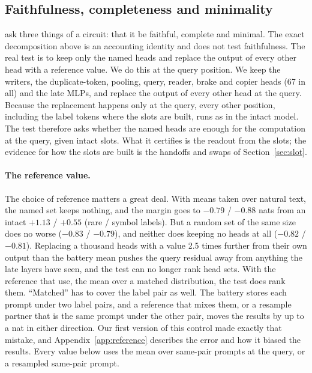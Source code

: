 \documentclass{article}
\begin{document}
\subsection{Faithfulness, completeness and minimality}\label{sec:faithful}
\citet{wang2022ioi} ask three things of a circuit: that it be faithful, complete and minimal. The exact decomposition above is an accounting identity and does not test faithfulness. The real test is to keep only the named heads and replace the output of every other head with a reference value. We do this at the query position. We keep the writers, the duplicate-token, pooling, query, reader, brake and copier heads (67 in all) and the late MLPs, and replace the output of every other head at the query. Because the replacement happens only at the query, every other position, including the label tokens where the slots are built, runs as in the intact model. The test therefore asks whether the named heads are enough for the computation at the query, given intact slots. What it certifies is the readout from the slots; the evidence for how the slots are built is the handoffs and swaps of Section~\ref{sec:slot}.

\paragraph{The reference value.} The choice of reference matters a great deal. With means taken over natural text, the named set keeps nothing, and the margin goes to $-0.79$ / $-0.88$ nats from an intact $+1.13$ / $+0.55$ (rare / symbol labels). But a random set of the same size does no worse ($-0.83$ / $-0.79$), and neither does keeping no heads at all ($-0.82$ / $-0.81$). Replacing a thousand heads with a value 2.5 times further from their own output than the battery mean pushes the query residual away from anything the late layers have seen, and the test can no longer rank head sets. With the reference that \citet{wang2022ioi} use, the mean over a matched distribution, the test does rank them. ``Matched'' has to cover the label pair as well. The battery stores each prompt under two label pairs, and a reference that mixes them, or a resample partner that is the same prompt under the other pair, moves the results by up to a nat in either direction. Our first version of this control made exactly that mistake, and Appendix~\ref{app:reference} describes the error and how it biased the results. Every value below uses the mean over same-pair prompts at the query, or a resampled same-pair prompt.
\end{document}
